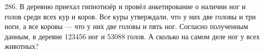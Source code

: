 286. В деревню приехал гипнотизёр и провёл анкетирование о наличии ног и голов среди всех кур и коров. Все куры утверждали, что у них две головы и три ноги, а все коровы --- что у них две головы и пять ног. Согласно полученным данным, в деревне 123456 ног и 53088 голов. А сколько на самом деле ног у всех животных?\\
